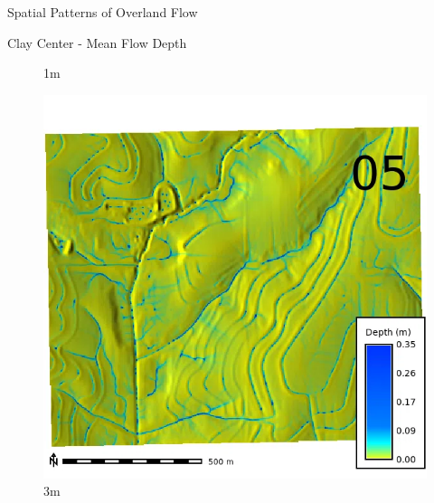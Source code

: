 \documentclass[
  ignorenonframetext,
]{beamer}
\begin{document}
\begin{frame}{Spatial Patterns of Overland Flow}
\begin{block}{Clay Center - Mean Flow Depth}
\begin{figure}[H]
{}

\caption{1m}

\end{figure}%

\begin{figure}[H]

{\centering \includegraphics{../output/clay-center/sensitivity_1/clay-center_depth_3_025_s_average.webp}

}

\caption{3m}

\end{figure}%

\begin{figure}[H]


\end{figure}
\end{block}
\end{frame}
\end{document}
